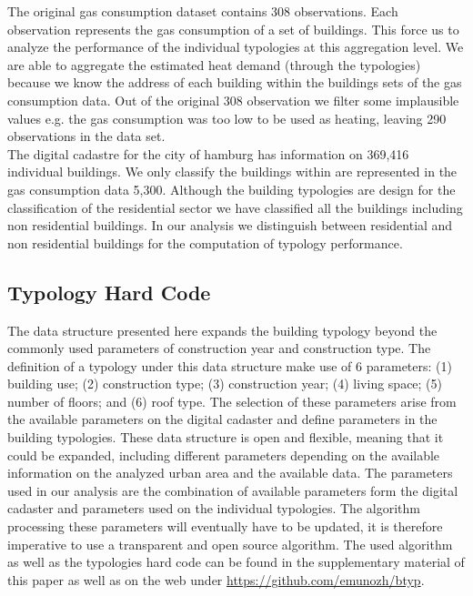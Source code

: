 \documentclass[authoryear,preprint,review,12pt]{elsarticle}
\begin{document}
\begin{linenumbers}
The original gas consumption dataset contains 308 observations. Each
observation represents the gas consumption of a set of buildings. This force us
to analyze the performance of the individual typologies at this aggregation
level. We are able to aggregate the estimated heat demand (through the
typologies) because we know the address of each building within the buildings
sets of the gas consumption data. Out of the original 308 observation we
filter some implausible values e.g. the gas consumption was too low to be used
as heating, leaving 290 observations in the data set.\\

The digital cadastre for the city of hamburg has information on 369,416
individual buildings. We only classify the buildings within are represented in
the gas consumption data 5,300. Although the building typologies are design for
the classification of the residential sector we have classified all the buildings
including non residential buildings. In our analysis we distinguish between
residential and non residential buildings for the computation of typology
performance.\\

\subsection{Typology Hard Code}\label{sub-sec:hcode}

The data structure presented here expands the building typology beyond the
commonly used parameters of construction year and construction type. The
definition of a typology under this data structure make use of 6 parameters:
(1) building use;
(2) construction type;
(3) construction year;
(4) living space;
(5) number of floors; and
(6) roof type.
The selection of these parameters arise from the available parameters on the
digital cadaster and define parameters in the building typologies. These data
structure is open and flexible, meaning that it could be expanded, including
different parameters depending on the available information on the analyzed
urban area and the available data. The parameters used in our analysis are the
combination of available parameters form the digital cadaster and parameters
used on the individual typologies. The algorithm processing these parameters
will eventually have to be updated, it is therefore imperative to use a
transparent and open source algorithm. The used algorithm as well as the
typologies hard code can be found in the supplementary material of this paper
as well as on the web under \url{https://github.com/emunozh/btyp}.\\


\end{linenumbers}
\end{document}
